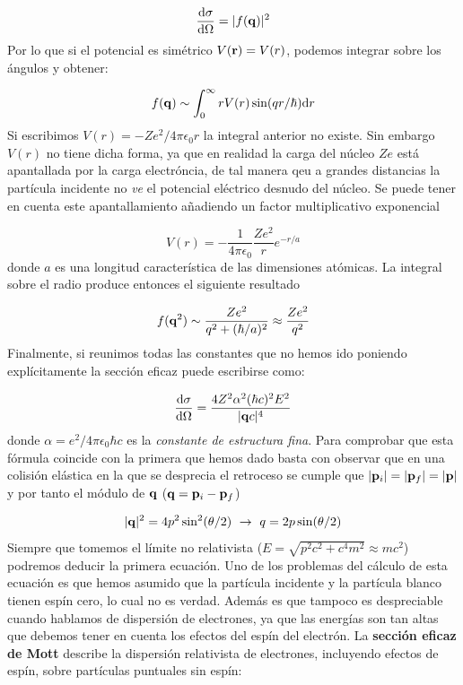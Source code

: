 \begin{equation}
	\frac{\mathrm{d} \sigma}{\mathrm{d} \Omega} = | f(\mathbf{q}) |^2
\end{equation}
Por lo que si el potencial es simétrico $V(\mathbf{r})=V(r)$, podemos integrar sobre los ángulos y obtener:

\begin{equation}
	f(\mathbf{q}) \sim \int_0^\infty r V(r) \sin (qr/\hbar) \mathrm{d} r
\end{equation}
Si escribimos $V(r)=-Ze^2/4\pi \epsilon_0 r$ la integral anterior no existe. Sin embargo $V(r)$ no tiene dicha forma, ya que en realidad la carga del núcleo $Ze$ está apantallada por la carga electróncia, de tal manera qeu a grandes distancias la partícula incidente no \textit{ve} el potencial eléctrico desnudo del núcleo. Se puede tener en cuenta este apantallamiento añadiendo un factor multiplicativo exponencial

\begin{equation}
    V(r) =  - \frac{1}{4 \pi \epsilon_0} \frac{Ze^2}{r} e^{-r/a}
\end{equation}
donde $a$ es una longitud característica de las dimensiones atómicas. La integral sobre el radio produce entonces el siguiente resultado

\begin{equation}
    f(\mathbf{q}^2) \sim \frac{Ze^2}{q^2+(\hbar/a)^2} \approx \frac{Ze^2}{q^2}
\end{equation}
Finalmente, si reunimos todas las constantes que no hemos ido poniendo explícitamente la sección eficaz puede escribirse como:

\begin{eqnarray}
	\frac{\mathrm{d} \sigma}{\mathrm{d} \Omega} = \frac{4Z^2\alpha^2 (\hbar c)^2 E^2 }{|\mathbf{q} c|^4}
\end{eqnarray}
donde $\alpha = e^2 / 4 \pi \epsilon_0 \hbar c$ es la \textit{constante de estructura fina}. Para comprobar que esta fórmula coincide con la primera que hemos dado basta con observar que en una colisión elástica en la que se desprecia el retroceso se cumple que $|\mathbf{p}_i|=|\mathbf{p}_f|=|\mathbf{p}|$ y por tanto el módulo de $\mathbf{q}$ ($\mathbf{q}=\mathbf{p}_i-\mathbf{p}_f$)

\begin{eqnarray}
	|\mathbf{q}|^2 = 4 p^2 \sin^2 (\theta/2) \ \rightarrow \ q = 2p \sin (\theta/2)
\end{eqnarray}
Siempre que tomemos el límite no relativista ($E=\sqrt{p^2c^2+c^4m^2}\approx mc^2$) podremos deducir la primera ecuación. Uno de los problemas del cálculo de esta ecuación es que hemos asumido que la partícula incidente y la partícula blanco tienen espín cero, lo cual no es verdad. Además es que tampoco es despreciable cuando hablamos de dispersión de electrones, ya que las energías son tan altas que debemos tener en cuenta los efectos del espín del electrón. La \textbf{sección eficaz de Mott} describe la dispersión relativista de electrones, incluyendo efectos de espín, sobre partículas puntuales sin espín:

